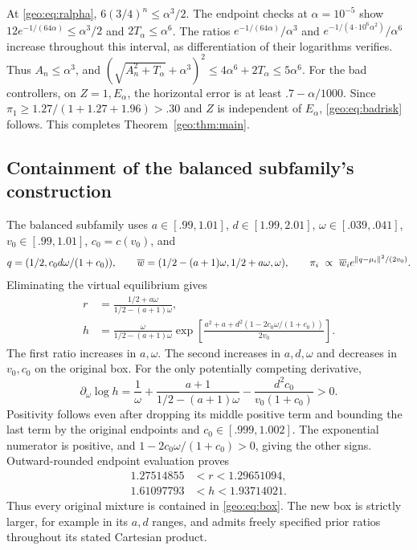 At \eqref{geo:eq:ralpha}, $6(3/4)^n\le\alpha^3/2$. The endpoint checks at
$\alpha=10^{-5}$ show $12e^{-1/(64\alpha)}\le\alpha^3/2$ and
$2T_\alpha\le\alpha^6$. The ratios
$e^{-1/(64\alpha)}/\alpha^3$ and
$e^{-1/(4\cdot10^6\alpha^2)}/\alpha^6$ increase throughout this interval,
as differentiation of their logarithms verifies. Thus $A_n\le\alpha^3$,
and $(\sqrt{A_n^2+T_\alpha}+\alpha^3)^2\le4\alpha^6+2T_\alpha\le5\alpha^6$.
For the bad controllers, on $Z=1,E_\alpha$, the horizontal error is at least
$.7-\alpha/1000$. Since
$\pi_1\ge1.27/(1+1.27+1.96)>.30$ and $Z$ is independent of $E_\alpha$,
\eqref{geo:eq:badrisk} follows. This completes Theorem~\ref{geo:thm:main}.

\subsection{Containment of the balanced subfamily's construction}
The balanced subfamily uses
$a\in[.99,1.01]$, $d\in[1.99,2.01]$, $\omega\in[.039,.041]$,
$v_0\in[.99,1.01]$, $c_0=c(v_0)$, and
\[
 q=(1/2,c_0d\omega/(1+c_0)),\qquad
 \overline w=(1/2-(a+1)\omega,1/2+a\omega,\omega),\qquad
 \pi_i\ \propto\ \overline w_i e^{\lVert q-\mu_i\rVert^2/(2v_0)}.
\]
Eliminating the virtual equilibrium gives
\begin{align}
 r&=\frac{1/2+a\omega}{1/2-(a+1)\omega},\label{geo:eq:oldr}\\
 h&=\frac{\omega}{1/2-(a+1)\omega}
 \exp\left[\frac{a^2+a+d^2(1-2c_0\omega/(1+c_0))}{2v_0}\right].
 \label{geo:eq:oldh}
\end{align}
The first ratio increases in $a,\omega$. The second increases in $a,d,\omega$
and decreases in $v_0,c_0$ on the original box. For the only potentially
competing derivative,
\[
 \partial_\omega\log h
 =\frac1\omega+\frac{a+1}{1/2-(a+1)\omega}
 -\frac{d^2c_0}{v_0(1+c_0)}>0.
\]
Positivity follows even after dropping its middle positive term and bounding
the last term by the original endpoints and $c_0\in[.999,1.002]$.
The exponential numerator is positive, and
$1-2c_0\omega/(1+c_0)>0$, giving the other signs. Outward-rounded endpoint
evaluation proves
\begin{align*}
 1.27514855&<r<1.29651094,\\
 1.61097793&<h<1.93714021.
\end{align*}
Thus every original mixture is contained in \eqref{geo:eq:box}. The new box is
strictly larger, for example in its $a,d$ ranges, and admits freely specified
prior ratios throughout its stated Cartesian product.

